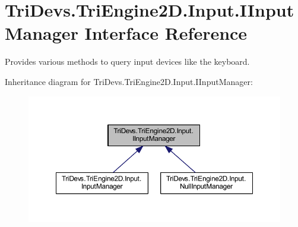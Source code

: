 \hypertarget{interface_tri_devs_1_1_tri_engine2_d_1_1_input_1_1_i_input_manager}{\section{Tri\-Devs.\-Tri\-Engine2\-D.\-Input.\-I\-Input\-Manager Interface Reference}
\label{interface_tri_devs_1_1_tri_engine2_d_1_1_input_1_1_i_input_manager}
}


Provides various methods to query input devices like the keyboard.  




Inheritance diagram for Tri\-Devs.\-Tri\-Engine2\-D.\-Input.\-I\-Input\-Manager\-:\nopagebreak
\begin{figure}[H]
\begin{center}
\leavevmode
\includegraphics[width=350pt]{interface_tri_devs_1_1_tri_engine2_d_1_1_input_1_1_i_input_manager__inherit__graph}
\end{center}
\end{figure}
